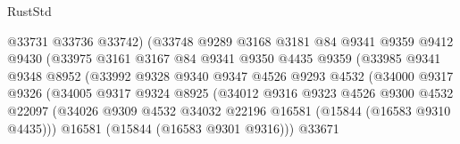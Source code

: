 \begin{lexlean}{RustStd}
\begin{coremodule}
                                  @33731
                                  @33736
                                  @33742)
                                (@33748
                                  @9289
                                  @3168
                                  @3181
                                  @84
                                  @9341
                                  @9359
                                  @9412
                                  @9430
                                  (@33975
                                    @3161
                                    @3167
                                    @84
                                    @9341
                                    @9350
                                    @4435
                                    @9359
                                    (@33985
                                      @9341
                                      @9348
                                      @8952
                                      (@33992
                                        @9328
                                        @9340
                                        @9347
                                        @4526
                                        @9293
                                        @4532
                                        (@34000
                                          @9317
                                          @9326
                                          (@34005
                                            @9317
                                            @9324
                                            @8925
                                            (@34012
                                              @9316
                                              @9323
                                              @4526
                                              @9300
                                              @4532
                                              @22097
                                              (@34026
                                                @9309
                                                @4532
                                                @34032
                                                @22196
                                                @16581
                                                (@15844 (@16583 @9310 @4435)))
                                              @16581
                                              (@15844 (@16583 @9301 @9316)))
                                            @33671

\end{coremodule}
\end{lexlean}
